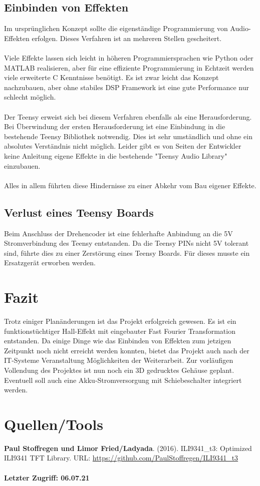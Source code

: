 \documentclass[12pt]{article}
\begin{document}
\subsection{Einbinden von Effekten}
Im ursprünglichen Konzept sollte die eigenständige Programmierung von Audio-Effekten erfolgen. 
Dieses Verfahren ist an mehreren Stellen gescheitert. 
\\
\\
Viele Effekte lassen sich leicht in höheren Programmiersprachen
wie Python oder MATLAB realisieren, aber für eine effiziente Programmierung in Echtzeit werden viele erweiterte C Kenntnisse benötigt. 
Es ist zwar leicht das Konzept nachzubauen, aber ohne stabiles DSP Framework ist eine gute 
Performance nur schlecht möglich. 
\\
\\
Der Teensy erweist sich bei diesem Verfahren ebenfalls als eine Herausforderung. Bei Überwindung der ersten Herausforderung 
ist eine Einbindung in die bestehende Teensy Bibliothek notwendig. Dies ist sehr umständlich und ohne ein absolutes Verständnis nicht möglich. 
Leider gibt es von Seiten der Entwickler keine Anleitung eigene Effekte in die bestehende "Teensy Audio Library" einzubauen. 
\\
\\
Alles in allem führten diese Hindernisse zu einer Abkehr vom Bau eigener Effekte.  
\subsection{Verlust eines Teensy Boards}
Beim Anschluss der Drehencoder ist eine fehlerhafte Anbindung an die 5V Stromverbindung des Teensy entstanden. 
Da die Teensy PINs nicht 5V tolerant sind, führte dies zu einer Zerstörung eines Teensy Boards.
Für dieses musste ein Ersatzgerät erworben werden. 

  
\section{Fazit}
Trotz einiger Planänderungen ist das Projekt erfolgreich gewesen. Es ist ein funktionstüchtiger Hall-Effekt mit eingebauter Fast Fourier Transformation
entstanden.
Da einige Dinge wie das Einbinden von Effekten zum jetzigen Zeitpunkt noch nicht erreicht werden konnten, bietet das Projekt auch nach der IT-Systeme 
Veranstaltung Möglichkeiten der Weiterarbeit. Zur vorläufigen Vollendung des Projektes ist nun noch ein 3D gedrucktes Gehäuse geplant. 
Eventuell soll auch eine Akku-Stromversorgung mit Schiebeschalter integriert werden.

\section{Quellen/Tools}
\rbrack \textbf{Paul Stoffregen und Limor Fried/Ladyada}. (2016). ILI9341\_t3: Optimized ILI9341 TFT Library.
URL: 
\url{https://github.com/PaulStoffregen/ILI9341_t3}
\\
\\
\textbf{Letzter Zugriff: 06.07.21}
\\
\\
\rbrack
\\
\\
\rbrack
\end{document}
